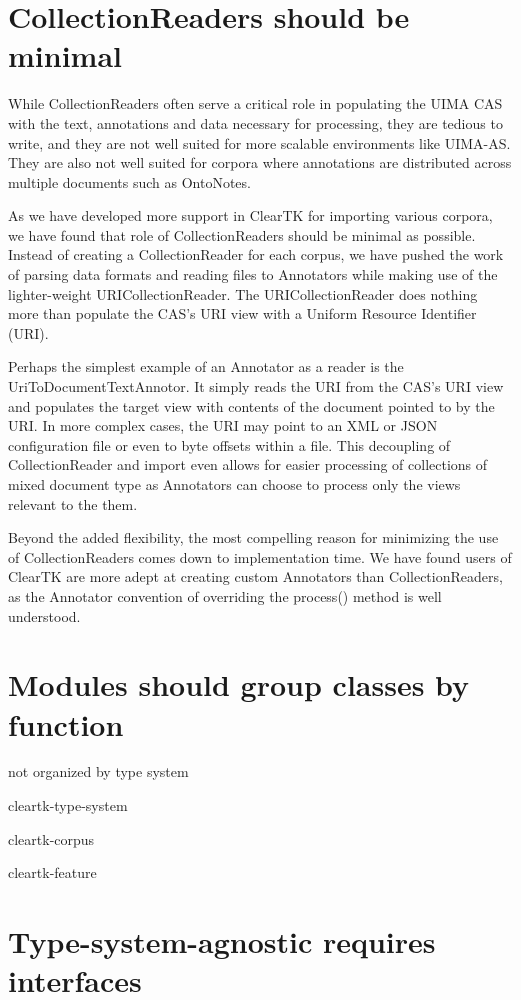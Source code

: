 \documentclass[10pt, a4paper]{article}
\begin{document}
\section{CollectionReaders should be minimal}

While CollectionReaders often serve a critical role in populating the UIMA CAS with the text, annotations and data necessary for processing, they are tedious to write, and they are not well suited for more scalable environments like UIMA-AS.  They are also not well suited for corpora where annotations are distributed across multiple documents such as OntoNotes.

As we have developed more support in ClearTK for importing various corpora, we have found that role of CollectionReaders should be minimal as possible.  Instead of creating a CollectionReader for each corpus, we have pushed the work of parsing data formats and reading files to Annotators while making use of the lighter-weight URICollectionReader.  The URICollectionReader does nothing more than populate the CAS's URI view with a Uniform Resource Identifier (URI).  

Perhaps the simplest example of an Annotator as a reader is the UriToDocumentTextAnnotor. It simply reads the URI from the CAS's URI view and populates the target view with contents of the document pointed to by the URI.  In more complex cases, the URI may point to an XML or JSON configuration file or even to byte offsets within a file.  This decoupling of CollectionReader and import even allows for easier processing of collections of mixed document type as Annotators can choose to process only the views relevant to the them.

Beyond the added flexibility, the most compelling reason for minimizing the use of CollectionReaders comes down to implementation time.  We have found users of ClearTK are more adept at creating custom Annotators than CollectionReaders, as the Annotator convention of overriding the process() method is well understood.


\section{Modules should group classes by function}
not organized by type system

cleartk-type-system

cleartk-corpus

cleartk-feature


\section{Type-system-agnostic requires interfaces}
\end{document}
